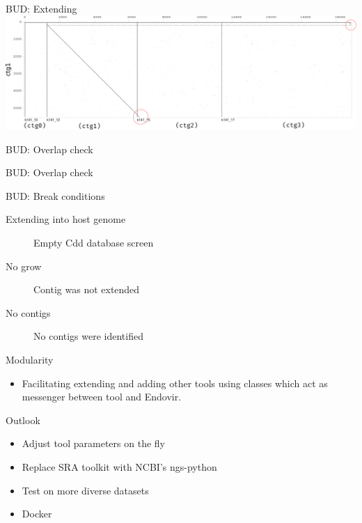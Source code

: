 \documentclass{beamer}
\begin{document}
  \begin{frame}{BUD: Extending}
    \includegraphics[width=\linewidth]{figs/ebovexample/flanks/flankgrow.pdf}
  \end{frame}


  \begin{frame}{BUD: Overlap check}
    
  \end{frame}

  \begin{frame}{BUD: Overlap check}
    
  \end{frame}

  \begin{frame}{BUD: Break conditions}
    \begin{description}
      \item[Extending into host genome]  Empty Cdd database screen
      \item[No grow] Contig was not extended
      \item[No contigs] No contigs were identified
    \end{description}
  \end{frame}

  \begin{frame}{Modularity}
    \begin{itemize}
     \item Facilitating extending and adding other tools using classes
           which act as messenger between tool and Endovir.
    \end{itemize}
    
  \end{frame}


  \begin{frame}{Outlook}
    \begin{itemize}
     \item Adjust tool parameters on the fly
     \item Replace SRA toolkit with NCBI's ngs-python
     \item Test on more diverse datasets
     \item Docker
    \end{itemize}
  \end{frame}
\end{document}

